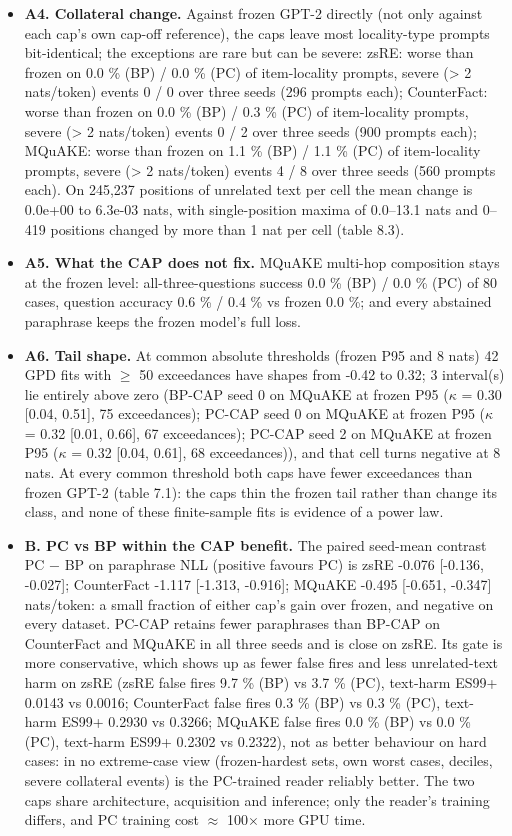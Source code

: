 \documentclass[10pt,a4paper]{article}
\begin{document}
\begin{itemize}
\item \textbf{A4. Collateral change.} Against frozen GPT-2 directly (not only against each cap's own cap-off reference), the caps leave most locality-type prompts bit-identical; the exceptions are rare but can be severe: zsRE: worse than frozen on 0.0 \% (BP) / 0.0 \% (PC) of item-locality prompts, severe (> 2 nats/token) events 0 / 0 over three seeds (296 prompts each); CounterFact: worse than frozen on 0.0 \% (BP) / 0.3 \% (PC) of item-locality prompts, severe (> 2 nats/token) events 0 / 2 over three seeds (900 prompts each); MQuAKE: worse than frozen on 1.1 \% (BP) / 1.1 \% (PC) of item-locality prompts, severe (> 2 nats/token) events 4 / 8 over three seeds (560 prompts each). On 245,237 positions of unrelated text per cell the mean change is 0.0e+00 to 6.3e-03 nats, with single-position maxima of 0.0–13.1 nats and 0–419 positions changed by more than 1 nat per cell (table 8.3).
\item \textbf{A5. What the CAP does not fix.} MQuAKE multi-hop composition stays at the frozen level: all-three-questions success 0.0 \% (BP) / 0.0 \% (PC) of 80 cases, question accuracy 0.6 \% / 0.4 \% vs frozen 0.0 \%; and every abstained paraphrase keeps the frozen model's full loss.
\item \textbf{A6. Tail shape.} At common absolute thresholds (frozen P95 and 8 nats) 42 GPD fits with $\ge$ 50 exceedances have shapes from -0.42 to 0.32; 3 interval(s) lie entirely above zero (BP-CAP seed 0 on MQuAKE at frozen P95 ($\kappa$ = 0.30 [0.04, 0.51], 75 exceedances); PC-CAP seed 0 on MQuAKE at frozen P95 ($\kappa$ = 0.32 [0.01, 0.66], 67 exceedances); PC-CAP seed 2 on MQuAKE at frozen P95 ($\kappa$ = 0.32 [0.04, 0.61], 68 exceedances)), and that cell turns negative at 8 nats. At every common threshold both caps have fewer exceedances than frozen GPT-2 (table 7.1): the caps thin the frozen tail rather than change its class, and none of these finite-sample fits is evidence of a power law.
\item \textbf{B. PC vs BP within the CAP benefit.} The paired seed-mean contrast PC $-$ BP on paraphrase NLL (positive favours PC) is zsRE -0.076 [-0.136, -0.027]; CounterFact -1.117 [-1.313, -0.916]; MQuAKE -0.495 [-0.651, -0.347] nats/token: a small fraction of either cap's gain over frozen, and negative on every dataset. PC-CAP retains fewer paraphrases than BP-CAP on CounterFact and MQuAKE in all three seeds and is close on zsRE. Its gate is more conservative, which shows up as fewer false fires and less unrelated-text harm on zsRE (zsRE false fires 9.7 \% (BP) vs 3.7 \% (PC), text-harm ES99+ 0.0143 vs 0.0016; CounterFact false fires 0.3 \% (BP) vs 0.3 \% (PC), text-harm ES99+ 0.2930 vs 0.3266; MQuAKE false fires 0.0 \% (BP) vs 0.0 \% (PC), text-harm ES99+ 0.2302 vs 0.2322), not as better behaviour on hard cases: in no extreme-case view (frozen-hardest sets, own worst cases, deciles, severe collateral events) is the PC-trained reader reliably better. The two caps share architecture, acquisition and inference; only the reader's training differs, and PC training cost $\approx$ 100$\times$ more GPU time.
\end{itemize}
\end{document}
